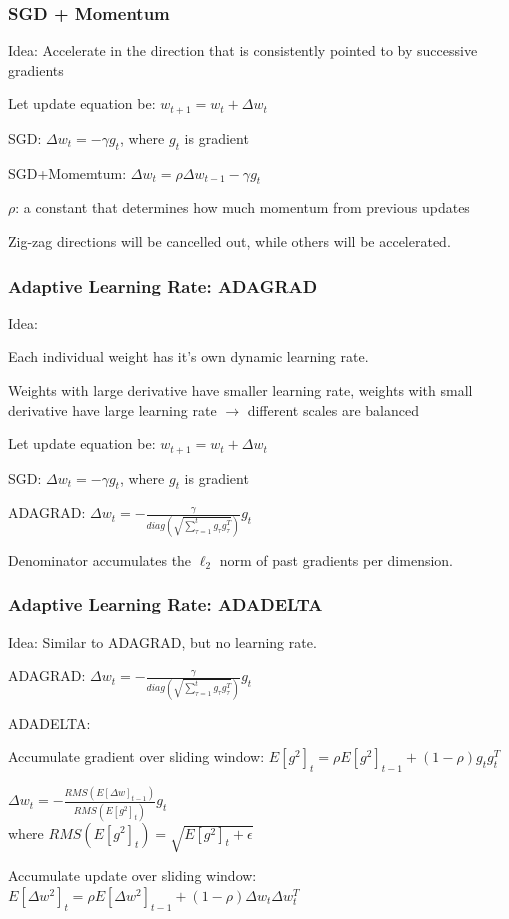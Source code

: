 \begin{frame}
\frametitle{SGD + Momentum}
\bi
\item Idea: Accelerate in the direction that is consistently pointed to by successive gradients
\pause
\item Let update equation be: $w_{t+1} = w_t + \Delta w_t$
	\bi
	\item SGD: $\Delta w_t = -\gamma g_t$, where $g_t$ is gradient
	\pause
	\item SGD+Momemtum: $\Delta w_t = \rho \Delta w_{t-1} - \gamma g_t$ \pause
	\ei
\item $\rho$: a constant that determines how much momentum from previous updates \pause
\item Zig-zag directions will be cancelled out, while others will be accelerated.
\ei
{}
\end{frame}

\begin{frame}
\frametitle{Adaptive Learning Rate: ADAGRAD \cite{duchi11adagrad}}
\bi
\item Idea: 
	\bi 
	\item Each individual weight has it's own dynamic learning rate. 
	\item Weights with large derivative have smaller learning rate, weights with small derivative have large learning rate $\rightarrow$ different scales are balanced
	\ei
\item Let update equation be: $w_{t+1} = w_t + \Delta w_t$
	\bi
	\item SGD: $\Delta w_t = -\gamma g_t$, where $g_t$ is gradient
	\item ADAGRAD: $\Delta w_t = - \frac{\gamma}{diag(\sqrt{\sum_{\tau=1}^t g_\tau g_\tau^T})} g_t$
	\ei 
\item Denominator accumulates the $\ell_2$ norm of past gradients per dimension. 
\ei
\end{frame}

\begin{frame}
\frametitle{Adaptive Learning Rate: ADADELTA \cite{zeiler12adadelta}}
\bi
\item Idea: Similar to ADAGRAD, but no learning rate.
	\bi
	\item ADAGRAD: $\Delta w_t = - \frac{\gamma}{diag(\sqrt{\sum_{\tau=1}^t g_\tau g_\tau^T})} g_t$
	\ei
\item ADADELTA: 
	\be
	\item Accumulate gradient over sliding window: $E[g^2]_t = \rho E[g^2]_{t-1} + (1-\rho) g_t g_t^T$\\[0.2cm]
	\item $\Delta w_t = - \frac{RMS(E[\Delta w]_{t-1})}{RMS(E[g^2]_t)} g_t$\\[0.2cm]
	 where $RMS(E[g^2]_t) = \sqrt{E[g^2]_t + \epsilon}$\\[0.2cm]
	\item Accumulate update over sliding window: $E[\Delta w^2]_t = \rho E[\Delta w^2]_{t-1} + (1-\rho) \Delta w_t \Delta w_t^T$
	\ee
\ei
\end{frame}

